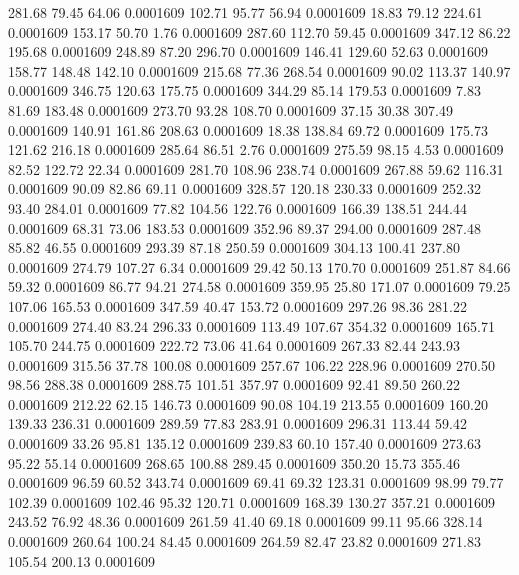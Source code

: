  281.68   79.45   64.06   0.0001609
 102.71   95.77   56.94   0.0001609
  18.83   79.12  224.61   0.0001609
 153.17   50.70    1.76   0.0001609
 287.60  112.70   59.45   0.0001609
 347.12   86.22  195.68   0.0001609
 248.89   87.20  296.70   0.0001609
 146.41  129.60   52.63   0.0001609
 158.77  148.48  142.10   0.0001609
 215.68   77.36  268.54   0.0001609
  90.02  113.37  140.97   0.0001609
 346.75  120.63  175.75   0.0001609
 344.29   85.14  179.53   0.0001609
   7.83   81.69  183.48   0.0001609
 273.70   93.28  108.70   0.0001609
  37.15   30.38  307.49   0.0001609
 140.91  161.86  208.63   0.0001609
  18.38  138.84   69.72   0.0001609
 175.73  121.62  216.18   0.0001609
 285.64   86.51    2.76   0.0001609
 275.59   98.15    4.53   0.0001609
  82.52  122.72   22.34   0.0001609
 281.70  108.96  238.74   0.0001609
 267.88   59.62  116.31   0.0001609
  90.09   82.86   69.11   0.0001609
 328.57  120.18  230.33   0.0001609
 252.32   93.40  284.01   0.0001609
  77.82  104.56  122.76   0.0001609
 166.39  138.51  244.44   0.0001609
  68.31   73.06  183.53   0.0001609
 352.96   89.37  294.00   0.0001609
 287.48   85.82   46.55   0.0001609
 293.39   87.18  250.59   0.0001609
 304.13  100.41  237.80   0.0001609
 274.79  107.27    6.34   0.0001609
  29.42   50.13  170.70   0.0001609
 251.87   84.66   59.32   0.0001609
  86.77   94.21  274.58   0.0001609
 359.95   25.80  171.07   0.0001609
  79.25  107.06  165.53   0.0001609
 347.59   40.47  153.72   0.0001609
 297.26   98.36  281.22   0.0001609
 274.40   83.24  296.33   0.0001609
 113.49  107.67  354.32   0.0001609
 165.71  105.70  244.75   0.0001609
 222.72   73.06   41.64   0.0001609
 267.33   82.44  243.93   0.0001609
 315.56   37.78  100.08   0.0001609
 257.67  106.22  228.96   0.0001609
 270.50   98.56  288.38   0.0001609
 288.75  101.51  357.97   0.0001609
  92.41   89.50  260.22   0.0001609
 212.22   62.15  146.73   0.0001609
  90.08  104.19  213.55   0.0001609
 160.20  139.33  236.31   0.0001609
 289.59   77.83  283.91   0.0001609
 296.31  113.44   59.42   0.0001609
  33.26   95.81  135.12   0.0001609
 239.83   60.10  157.40   0.0001609
 273.63   95.22   55.14   0.0001609
 268.65  100.88  289.45   0.0001609
 350.20   15.73  355.46   0.0001609
  96.59   60.52  343.74   0.0001609
  69.41   69.32  123.31   0.0001609
  98.99   79.77  102.39   0.0001609
 102.46   95.32  120.71   0.0001609
 168.39  130.27  357.21   0.0001609
 243.52   76.92   48.36   0.0001609
 261.59   41.40   69.18   0.0001609
  99.11   95.66  328.14   0.0001609
 260.64  100.24   84.45   0.0001609
 264.59   82.47   23.82   0.0001609
 271.83  105.54  200.13   0.0001609
